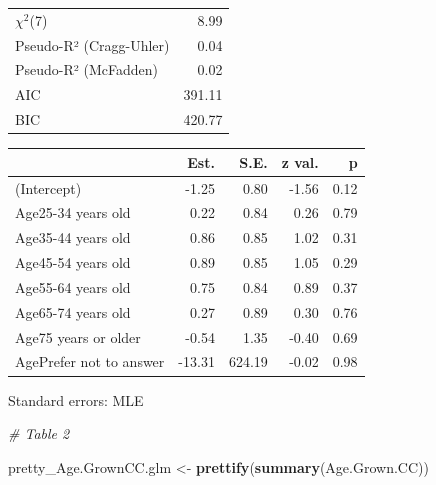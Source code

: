 \documentclass[12pt,]{article}
\newenvironment{Shaded}{\begin{snugshade}}{\end{snugshade}}
\newcommand{\KeywordTok}[1]{\textcolor[rgb]{0.13,0.29,0.53}{\textbf{#1}}}
\newcommand{\StringTok}[1]{\textcolor[rgb]{0.31,0.60,0.02}{#1}}
\newcommand{\CommentTok}[1]{\textcolor[rgb]{0.56,0.35,0.01}{\textit{#1}}}
\newcommand{\NormalTok}[1]{#1}
\begin{document}
\begin{table}[!h]
\centering
\begin{tabular}{lr}
\toprule
\rowcolor{gray!6}  $\chi^2$(7) & 8.99\\
Pseudo-R² (Cragg-Uhler) & 0.04\\
\rowcolor{gray!6}  Pseudo-R² (McFadden) & 0.02\\
AIC & 391.11\\
\rowcolor{gray!6}  BIC & 420.77\\
\bottomrule
\end{tabular}
\end{table}

\begin{table}[!h]
\centering
\begin{threeparttable}
\begin{tabular}{lrrrr}
\toprule
  & Est. & S.E. & z val. & p\\
\midrule
\rowcolor{gray!6}  (Intercept) & -1.25 & 0.80 & -1.56 & 0.12\\
Age25-34 years old & 0.22 & 0.84 & 0.26 & 0.79\\
\rowcolor{gray!6}  Age35-44 years old & 0.86 & 0.85 & 1.02 & 0.31\\
Age45-54 years old & 0.89 & 0.85 & 1.05 & 0.29\\
\rowcolor{gray!6}  Age55-64 years old & 0.75 & 0.84 & 0.89 & 0.37\\
\addlinespace
Age65-74 years old & 0.27 & 0.89 & 0.30 & 0.76\\
\rowcolor{gray!6}  Age75 years or older & -0.54 & 1.35 & -0.40 & 0.69\\
AgePrefer not to answer & -13.31 & 624.19 & -0.02 & 0.98\\
\bottomrule
\end{tabular}
\begin{tablenotes}
\item Standard errors: MLE
\end{tablenotes}
\end{threeparttable}
\end{table}

\begin{Shaded}
\begin{Highlighting}[]
\CommentTok{# Table 2}

\NormalTok{pretty_Age.GrownCC.glm <-}\StringTok{ }\KeywordTok{prettify}\NormalTok{(}\KeywordTok{summary}\NormalTok{(Age.Grown.CC))}
\end{Highlighting}
\end{Shaded}
\end{document}
